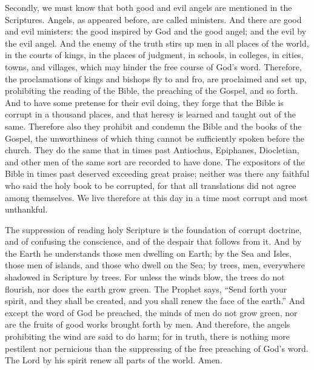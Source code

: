 Secondly, we must know that both good and evil angels are mentioned in the Scriptures. Angels, as appeared before, are called ministers. And there are good and evil ministers: the good inspired by God and the good angel; and the evil by the evil angel. And the enemy of the truth stirs up men in all places of the world, in the courts of kings, in the places of judgment, in schools, in colleges, in cities, towns, and villages, which may hinder the free course of God’s word. Therefore, the proclamations of kings and bishops fly to and fro, are proclaimed and set up, prohibiting the reading of the Bible, the preaching of the Gospel, and so forth. And to have some pretense for their evil doing, they forge that the Bible is corrupt in a thousand places, and that heresy is learned and taught out of the same. Therefore also they prohibit and condemn the Bible and the books of the Gospel, the unworthiness of which thing cannot be sufficiently spoken before the church. They do the same that in times past Antiochus, Epiphanes, Diocletian, and other men of the same sort are recorded to have done. The expositors of the Bible in times past deserved exceeding great praise; neither was there any faithful who said the holy book to be corrupted, for that all translations did not agree among themselves. We live therefore at this day in a time most corrupt and most unthankful.

The suppression of reading holy Scripture is the foundation of corrupt doctrine, and of confusing the conscience, and of the despair that follows from it. And by the Earth he understands those men dwelling on Earth; by the Sea and Isles, those men of islands, and those who dwell on the Sea; by trees, men, everywhere shadowed in Scripture by trees. For unless the winds blow, the trees do not flourish, nor does the earth grow green. The Prophet says, “Send forth your spirit, and they shall be created, and you shall renew the face of the earth.” And except the word of God be preached, the minds of men do not grow green, nor are the fruits of good works brought forth by men. And therefore, the angels prohibiting the wind are said to do harm; for in truth, there is nothing more pestilent nor pernicious than the suppressing of the free preaching of God’s word. The Lord by his spirit renew all parts of the world. Amen.
